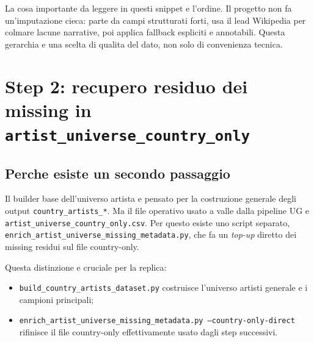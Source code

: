 \documentclass[11pt]{article}
\begin{document}
La cosa importante da leggere in questi snippet e l'ordine. Il progetto non fa un'imputazione cieca: parte da campi strutturati forti, usa il lead Wikipedia per colmare lacune narrative, poi applica fallback espliciti e annotabili. Questa gerarchia e una scelta di qualita del dato, non solo di convenienza tecnica.

\section{Step 2: recupero residuo dei missing in \texttt{artist\_universe\_country\_only}}
\subsection{Perche esiste un secondo passaggio}
Il builder base dell'universo artista e pensato per la costruzione generale degli output \texttt{country\_artists\_*}. Ma il file operativo usato a valle dalla pipeline UG e \texttt{artist\_universe\_country\_only.csv}. Per questo esiste uno script separato, \texttt{enrich\_artist\_universe\_missing\_metadata.py}, che fa un \emph{top-up} diretto dei missing residui sul file country-only.

Questa distinzione e cruciale per la replica:
\begin{itemize}[leftmargin=2em]
\item \texttt{build\_country\_artists\_dataset.py} costruisce l'universo artisti generale e i campioni principali;
\item \texttt{enrich\_artist\_universe\_missing\_metadata.py --country-only-direct} rifinisce il file country-only effettivamente usato dagli step successivi.
\end{itemize}
\end{document}
